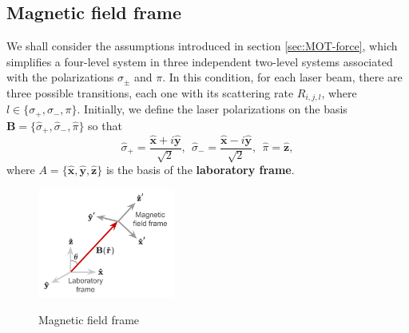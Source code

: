 \subsection{Magnetic field frame}
\label{sec:magnetic-field-frame}

We shall consider the assumptions introduced in section \ref{sec:MOT-force}, which simplifies a four-level system in three independent two-level systems associated with the polarizations $ \sigma_{\pm} $ and $ \pi $. In this condition, for each laser beam, there are three possible transitions, each one with its scattering rate $ R_{i,j,l} $, where $ l \in \{\sigma_{+}, \sigma_{-}, \pi \} $. Initially, we define the laser polarizations on the basis $ \mathbf{B} = \{\hat{\sigma}_{+}, \hat{\sigma}_{-}, \hat{\pi} \} $ so that
\begin{equation}
    \hat{\sigma}_+ = \frac{\mathbf{\hat{x}} + i\mathbf{\hat{y}}}{\sqrt{2}},\ \ \hat{\sigma}_- = \frac{\mathbf{\hat{x}} - i\mathbf{\hat{y}}}{\sqrt{2}},\ \ \hat{\pi} = \mathbf{\hat{z}},
\end{equation}
where $ A = \{\mathbf{\hat{x}}, \mathbf{\hat{y}}, \mathbf{\hat{z}}\} $ is the basis of the \textbf{laboratory frame}.
\begin{figure}[!ht]
    \centering
    \caption{Magnetic field frame}
    \includegraphics[width=0.4\textwidth]{USPSC-img/polarization_basis.png}
    \vspace{5px}
    \label{fig:magnetic-field-frame}
\end{figure}

